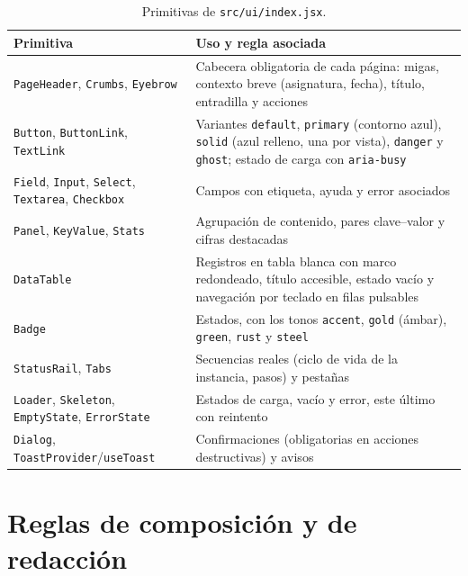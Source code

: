 \begin{table}[htbp]
  \centering
  \small
  \begin{tabular}{p{}p{}}
    \toprule
    \textbf{Primitiva} & \textbf{Uso y regla asociada} \\
    \midrule
    \texttt{PageHeader}, \texttt{Crumbs}, \texttt{Eyebrow} &
      Cabecera obligatoria de cada página: migas, contexto breve (asignatura, fecha),
      título, entradilla y acciones \\
    \texttt{Button}, \texttt{ButtonLink}, \texttt{TextLink} &
      Variantes \texttt{default}, \texttt{primary} (contorno azul), \texttt{solid}
      (azul relleno, una por vista), \texttt{danger} y \texttt{ghost}; estado de
      carga con \texttt{aria-busy} \\
    \texttt{Field}, \texttt{Input}, \texttt{Select}, \texttt{Textarea},
      \texttt{Checkbox} & Campos con etiqueta, ayuda y error asociados \\
    \texttt{Panel}, \texttt{KeyValue}, \texttt{Stats} &
      Agrupación de contenido, pares clave--valor y cifras destacadas \\
    \texttt{DataTable} &
      Registros en tabla blanca con marco redondeado, título accesible, estado vacío y
      navegación por teclado en filas pulsables \\
    \texttt{Badge} & Estados, con los tonos \texttt{accent}, \texttt{gold} (ámbar),
      \texttt{green}, \texttt{rust} y \texttt{steel} \\
    \texttt{StatusRail}, \texttt{Tabs} &
      Secuencias reales (ciclo de vida de la instancia, pasos) y pestañas \\
    \texttt{Loader}, \texttt{Skeleton}, \texttt{EmptyState}, \texttt{ErrorState} &
      Estados de carga, vacío y error, este último con reintento \\
    \texttt{Dialog}, \texttt{ToastProvider}/\texttt{useToast} &
      Confirmaciones (obligatorias en acciones destructivas) y avisos \\
    \bottomrule
  \end{tabular}
  \caption{Primitivas de \texttt{src/ui/index.jsx}.\label{TAB:STYLE-PRIMITIVES}}
\end{table}

\section*{Reglas de composición y de redacción}

